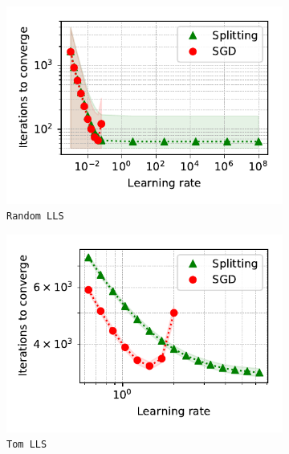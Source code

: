 \documentclass{article}
\begin{document}
\begin{figure}[h!]
    \begin{subfigure}[b]{0.25\textwidth}
            \centering
            \includegraphics[width=\linewidth]{LLS_iter.pdf}
            \caption{{\small \texttt{Random LLS}}}
    \end{subfigure}%
    \begin{subfigure}[b]{0.25\textwidth}
            \centering
            \includegraphics[width=\linewidth]{LLS_tom_iter.pdf}
            \caption{{\small \texttt{Tom LLS}}}
    \end{subfigure}%
    \begin{subfigure}[b]{0.25\textwidth}
            \centering

\end{subfigure}
\end{figure}
\end{document}
